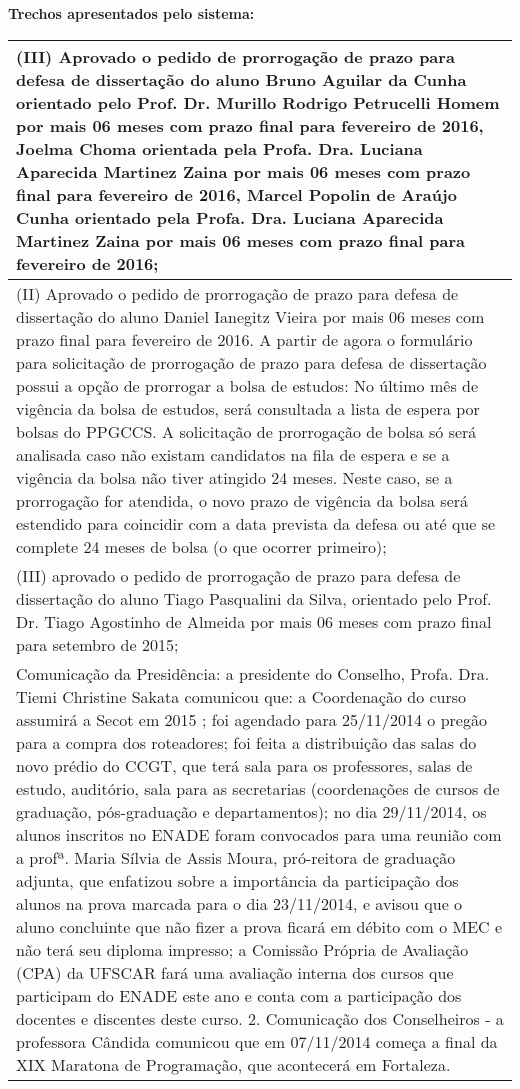 \noindent
\textbf{Trechos apresentados pelo sistema:}
\begin{longtable}{|p{17.5cm}|}
\hline 
(III) Aprovado o pedido de prorrogação de prazo para defesa de dissertação do aluno Bruno Aguilar da Cunha orientado pelo Prof. Dr. Murillo Rodrigo Petrucelli Homem por mais 06 meses com prazo final para fevereiro de 2016, Joelma Choma orientada pela Profa. Dra. Luciana Aparecida Martinez Zaina por mais 06 meses com prazo final para fevereiro de 2016, Marcel Popolin de Araújo Cunha orientado pela Profa. Dra. Luciana Aparecida Martinez Zaina por mais 06 meses com prazo final para fevereiro de 2016;

 \\ \hline 
(II) Aprovado o pedido de prorrogação de prazo para defesa de dissertação do aluno Daniel Ianegitz Vieira por mais 06 meses com prazo final para fevereiro de 2016. A partir de agora o formulário para solicitação de prorrogação de prazo para defesa de dissertação possui a opção de prorrogar a bolsa de estudos: No último mês de vigência da bolsa de estudos, será consultada a lista de espera por bolsas do PPGCCS. A solicitação de prorrogação de bolsa só será analisada caso não existam candidatos na fila de espera e se a vigência da bolsa não tiver atingido 24 meses. Neste caso, se a prorrogação for atendida, o novo prazo de vigência da bolsa será estendido para coincidir com a data prevista da defesa ou até que se complete 24 meses de bolsa (o que ocorrer primeiro);

 \\ \hline 
(III) aprovado o pedido de prorrogação de prazo para defesa de dissertação do aluno Tiago Pasqualini da Silva, orientado pelo Prof. Dr. Tiago Agostinho de Almeida por mais 06 meses com prazo final para setembro de 2015;

 \\ \hline 
Comunicação da Presidência: a presidente do Conselho, Profa. Dra. Tiemi Christine Sakata comunicou que: a Coordenação do curso assumirá a Secot em 2015 ; foi agendado para 25/11/2014 o pregão para a compra dos roteadores; foi feita a distribuição das salas do novo prédio do CCGT, que terá sala para os professores, salas de estudo, auditório, sala para as secretarias (coordenações de cursos de graduação, pós-graduação e departamentos); no dia 29/11/2014, os alunos inscritos no ENADE foram convocados para uma reunião com a profª. Maria Sílvia de Assis Moura, pró-reitora de graduação adjunta, que enfatizou sobre a importância da participação dos alunos na prova marcada para o dia 23/11/2014, e avisou que o aluno concluinte que não fizer a prova ficará em débito com o MEC e não terá seu diploma impresso; a Comissão Própria de Avaliação (CPA) da UFSCAR fará uma avaliação interna dos cursos que participam do ENADE este ano e conta com a participação dos docentes e discentes deste curso. 2. Comunicação dos Conselheiros - a professora Cândida comunicou que em 07/11/2014 começa a final da XIX Maratona de Programação, que acontecerá em Fortaleza.


\end{longtable}
